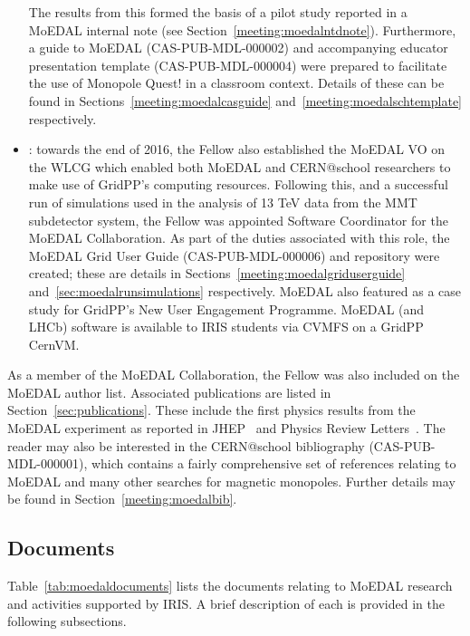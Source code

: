 \begin{itemize}
The results from this formed the basis of a pilot study
reported in a \acs{MoEDAL} internal note
(see Section~\ref{meeting:moedalntdnote}).
Furthermore, a guide to MoEDAL (CAS-PUB-MDL-000002)
and accompanying educator presentation template (CAS-PUB-MDL-000004)
were prepared to facilitate the use of Monopole Quest! in
a classroom context. Details of these can be found in
Sections~\ref{meeting:moedalcasguide} and~\ref{meeting:moedalschtemplate}
respectively.
%
\item {}:
towards the end of 2016, the Fellow also established the
\acs{MoEDAL} \acf{VO} on the \acf{WLCG} which enabled both
\acs{MoEDAL} and CERN@school researchers to make use of
GridPP's computing resources.
Following this, and a successful run of simulations used in the
analysis of 13 TeV data from the
\acf{MMT} subdetector system,
the Fellow was appointed Software Coordinator for the
\acs{MoEDAL} Collaboration.
As part of the duties associated with this role,
the MoEDAL Grid User Guide (CAS-PUB-MDL-000006)
and  repository
were created; these are details in Sections~\ref{meeting:moedalgriduserguide}
and~\ref{sec:moedalrunsimulations} respectively.
MoEDAL also featured as a case study for
GridPP's New User Engagement Programme.
MoEDAL (and \acs{LHCb}) software is available to
\acs{IRIS} students via \acs{CVMFS} on a GridPP CernVM.
\end{itemize}

As a member of the \acs{MoEDAL} Collaboration,
the Fellow was also included on the \acs{MoEDAL} author list.
Associated publications are listed in Section~\ref{sec:publications}.
These include the first physics results from the \acs{MoEDAL}
experiment as reported in \acs{JHEP}~\cite{MoEDAL2016a}
and Physics Review Letters~\cite{MoEDAL2017a}.
The reader may also be interested in
the CERN@school bibliography (CAS-PUB-MDL-000001),
which contains a fairly comprehensive set of references
relating to MoEDAL and many other searches for magnetic monopoles.
Further details may be found in Section~\ref{meeting:moedalbib}.

\clearpage

\subsection{Documents}
\label{sec:moedaldocuments}
Table~\ref{tab:moedaldocuments} lists the documents relating to
\acs{MoEDAL} research and activities supported by \acs{IRIS}.
A brief description of each is provided 
in the following subsections.


